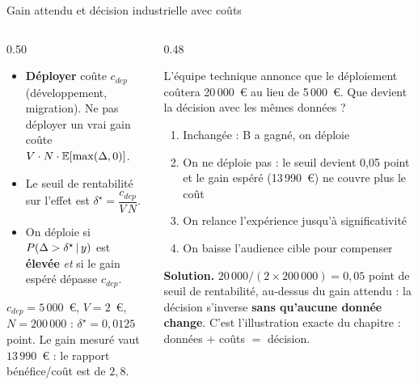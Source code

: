\begin{frame}{Gain attendu et décision industrielle avec coûts}
\footnotesize
\begin{columns}[t]
\begin{column}{0.50\textwidth}
\begin{kbox}
\begin{itemize}
  \item \textbf{Déployer} coûte $c_{dep}$ (développement, migration).
        Ne pas déployer un vrai gain coûte
        $V \cdot N \cdot \mathbb{E}[\max(\Delta,0)]$.
  \item Le seuil de rentabilité sur l'effet est
        $\delta^\star = \dfrac{c_{dep}}{V\,N}$.
  \item On déploie si $P(\Delta > \delta^\star \,\vert\, y)$ est
        \textbf{élevée} \emph{et} si le gain espéré dépasse $c_{dep}$.
\end{itemize}
\end{kbox}
\begin{ebox}
$c_{dep} = 5\,000$~€, $V = 2$~€, $N = 200\,000$ :
$\delta^\star = 0{,}0125$ point. Le gain mesuré vaut $13\,990$~€ :
le rapport bénéfice/coût est de $2{,}8$.
\end{ebox}
\end{column}
\begin{column}{0.48\textwidth}
\begin{qbox}
L'équipe technique annonce que le déploiement coûtera 20\,000~€ au lieu de
5\,000~€. Que devient la décision avec les mêmes données ?
\vspace{2mm}
\begin{enumerate}
  \item[(A)] Inchangée : B a gagné, on déploie
  \item[(B)] On ne déploie pas : le seuil devient 0,05 point et le gain
        espéré (13\,990~€) ne couvre plus le coût \checkmark
  \item[(C)] On relance l'expérience jusqu'à significativité
  \item[(D)] On baisse l'audience cible pour compenser
\end{enumerate}
\vspace{2mm}
\textcolor{byBlue}{\textbf{Solution.}} $20\,000/(2\times200\,000) = 0{,}05$ point
de seuil de rentabilité, au-dessus du gain attendu : la décision
s'inverse \textbf{sans qu'aucune donnée change}. C'est l'illustration exacte
du chapitre : données $+$ coûts $=$ décision.
\end{qbox}
\end{column}
\end{columns}
\end{frame}

